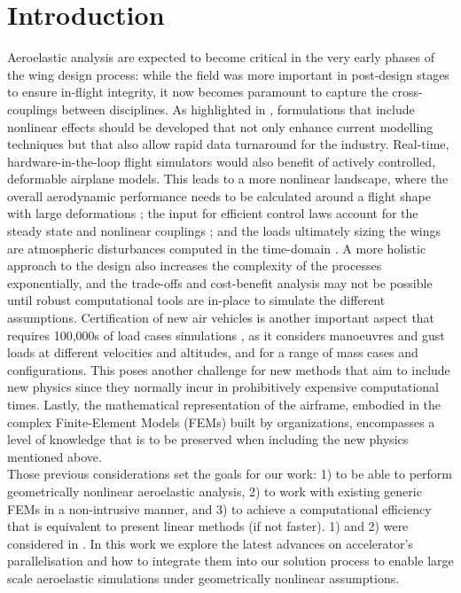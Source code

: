 \documentclass[11pt]{article}
\begin{document}
\section{Introduction}
\label{sec:orgace15ff}
Aeroelastic analysis are expected to become critical in the very early phases of the wing design process: while the field was more important in post-design stages to ensure in-flight integrity, it now becomes paramount to capture the cross-couplings between disciplines. 
As highlighted in \cite{LIVNE2018}, formulations that include nonlinear effects should be developed that not only enhance current modelling techniques  but that also allow rapid data turnaround for the industry. Real-time, hardware-in-the-loop flight simulators would also benefit of actively controlled, deformable airplane models. This leads to a more nonlinear landscape, where the overall aerodynamic performance needs to be calculated around a flight shape with large deformations \cite{JONSSON2023}; the input for efficient control laws account for the steady state and nonlinear couplings \cite{Artola2021}; and the loads ultimately sizing the wings are atmospheric disturbances computed in the time-domain \cite{CESNIK2014}.
A more holistic approach to the design also increases the complexity of the processes exponentially, and the trade-offs and cost-benefit analysis may not be possible until robust computational tools are in-place to simulate the different assumptions.
 Certification of new air vehicles is another important aspect that requires 100,000s of load cases simulations \cite{Kier2017}, as it considers manoeuvres and gust loads at different velocities and altitudes, and for a range of mass cases and configurations. This poses another challenge for new methods that aim to include new physics since they normally incur in prohibitively expensive computational times. 
Lastly, the mathematical representation of the airframe, embodied in the complex Finite-Element Models (FEMs) built by organizations, encompasses a level of knowledge that is to be preserved when including the new physics mentioned above. 
\\[0pt]
Those previous considerations set the goals for our  work: 1) to be able to perform geometrically nonlinear aeroelastic analysis, 2) to work with existing generic FEMs in a non-intrusive manner, and 3) to achieve a computational efficiency that is equivalent to present linear methods (if not faster). 1) and 2) were considered in \cite{CEA2023,CEA2024}. 
In this work we explore the latest advances on accelerator's parallelisation and how to integrate them into our solution process to enable large scale aeroelastic simulations under geometrically nonlinear assumptions.
\end{document}
